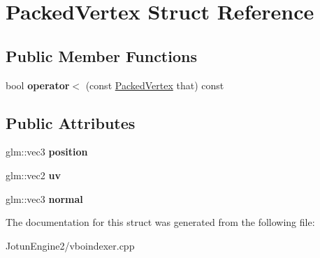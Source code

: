 \hypertarget{struct_packed_vertex}{\section{Packed\-Vertex Struct Reference}
\label{struct_packed_vertex}
}
\subsection*{Public Member Functions}
\begin{DoxyCompactItemize}
\item 
\hypertarget{struct_packed_vertex_a86a90d456e948b1105c7e8905f4fa385}{bool {\bfseries operator$<$} (const \hyperlink{struct_packed_vertex}{Packed\-Vertex} that) const }\label{struct_packed_vertex_a86a90d456e948b1105c7e8905f4fa385}

\end{DoxyCompactItemize}
\subsection*{Public Attributes}
\begin{DoxyCompactItemize}
\item 
\hypertarget{struct_packed_vertex_a5ef57f8f17bfb8a6f5014a943eacecc9}{glm\-::vec3 {\bfseries position}}\label{struct_packed_vertex_a5ef57f8f17bfb8a6f5014a943eacecc9}

\item 
\hypertarget{struct_packed_vertex_a1fd4c6774f04d72651423ca054ae5b26}{glm\-::vec2 {\bfseries uv}}\label{struct_packed_vertex_a1fd4c6774f04d72651423ca054ae5b26}

\item 
\hypertarget{struct_packed_vertex_a1e1099f55d9c2837da6d579c3bb6a633}{glm\-::vec3 {\bfseries normal}}\label{struct_packed_vertex_a1e1099f55d9c2837da6d579c3bb6a633}

\end{DoxyCompactItemize}


The documentation for this struct was generated from the following file\-:\begin{DoxyCompactItemize}
\item 
Jotun\-Engine2/vboindexer.\-cpp\end{DoxyCompactItemize}

